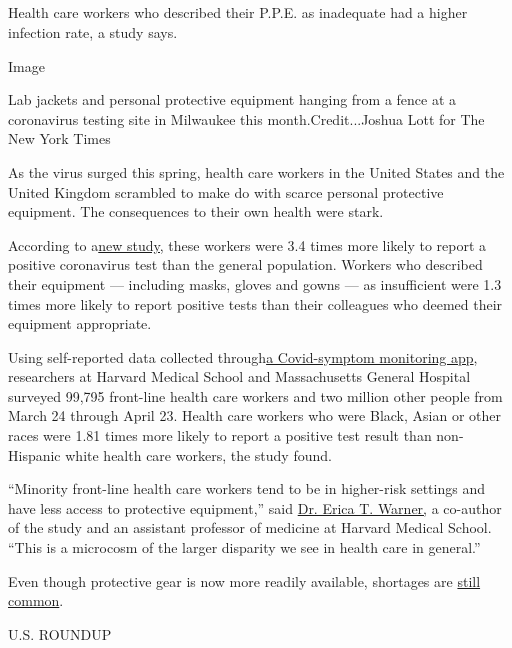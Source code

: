 \hypertarget{-9}{%
\subsection{}\label{-9}}

Health care workers who described their P.P.E. as inadequate had a
higher infection rate, a study says.

Image

Lab jackets and personal protective equipment hanging from a fence at a
coronavirus testing site in Milwaukee this month.Credit...Joshua Lott
for The New York Times

As the virus surged this spring, health care workers in the United
States and the United Kingdom scrambled to make do with scarce personal
protective equipment. The consequences to their own health were stark.

According to
a\href{https://www.thelancet.com/journals/lanpub/article/PIIS2468-2667(20)30164-X/fulltext}{new
study,} these workers were 3.4 times more likely to report a positive
coronavirus test than the general population. Workers who described
their equipment --- including masks, gloves and gowns --- as
insufficient were 1.3 times more likely to report positive tests than
their colleagues who deemed their equipment appropriate.

Using self-reported data collected
through\href{https://covid.joinzoe.com/us}{a Covid-symptom monitoring
app}, researchers at Harvard Medical School and Massachusetts General
Hospital surveyed 99,795 front-line health care workers and two million
other people from March 24 through April 23. Health care workers who
were Black, Asian or other races were 1.81 times more likely to report a
positive test result than non-Hispanic white health care workers, the
study found.

``Minority front-line health care workers tend to be in higher-risk
settings and have less access to protective equipment,'' said
\href{https://cgvh.harvard.edu/people/erica-warner}{Dr. Erica T.
Warner,} a co-author of the study and an assistant professor of medicine
at Harvard Medical School. ``This is a microcosm of the larger disparity
we see in health care in general.''

Even though protective gear is now more readily available, shortages are
\href{https://www.nytimes3xbfgragh.onion/2020/07/08/health/coronavirus-masks-ppe-doc.html}{still
common}.

U.S. ROUNDUP

\hypertarget{-10}{%
\subsection{}\label{-10}}

